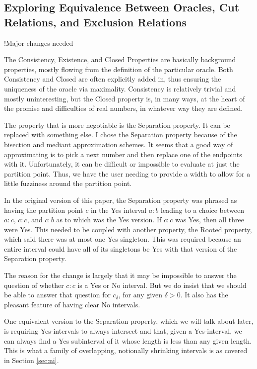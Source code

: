 \documentclass[12pt]{article}
\begin{document}
\subsection{Exploring Equivalence Between Oracles, Cut Relations, and Exclusion Relations}

!Major changes needed 

The Consistency, Existence, and Closed Properties are basically background properties, mostly flowing from the definition of the particular oracle. Both Consistency and Closed are often explicitly added in, thus ensuring the uniqueness of the oracle via maximality. Consistency is relatively trivial and mostly uninteresting, but the Closed property is, in many ways, at the heart of the promise and difficulties of real numbers, in whatever way they are defined. 

The property that is more negotiable is the Separation property. It can be replaced with something else. I chose the Separation property because of the bisection and mediant approximation schemes. It seems that a good way of approximating is to pick a next number and then replace one of the endpoints with it. Unfortunately, it can be difficult or impossible to evaluate at just the partition point. Thus, we have the user needing to provide a width to allow for a little fuzziness around the partition point. 

In the original version of this paper, the Separation property was phrased as having the partition point $c$ in the Yes interval $a:b$ leading to a choice between $a:c$, $c:c$, and $c:b$ as to which was the Yes version. If $c:c$ was Yes, then all three were Yes. This needed to be coupled with another property, the Rooted property, which said there was at most one Yes singleton. This was required because an entire interval could have all of its singletons be Yes with that version of the Separation property. 

The reason for the change is largely that it may be impossible to answer the question of whether $c:c$ is a Yes or No interval. But we do insist that we should be able to answer that question for $c_\delta$, for any given $\delta > 0$. It also has the pleasant feature of having clear No intervals. 

One equivalent version to the Separation property, which we will talk about later, is requiring Yes-intervals to always intersect and that, given a Yes-interval, we can always find a Yes subinterval of it whose length is less than any given length. This is what a family of overlapping, notionally shrinking intervals is as covered in Section \ref{sec:ni}.
\end{document}
